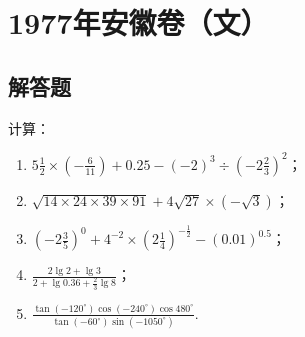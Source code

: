 \chapter{1977年安徽卷（文）}

\section{解答题}

\begin{problem}
计算：

\begin{enumerate}
    \item \(5\frac{1}{2}\times\left(-\frac{6}{11}\right)+0.25-(-2)^3\div\left(-2\frac{2}{3}\right)^2\)；
    \item \(\sqrt{14\times24\times39\times91}+4\sqrt{27}\times(-\sqrt{3})\)；
    \item \(\left(-2\frac{3}{5}\right)^0+4^{-2}\times\left(2\frac{1}{4}\right)^{-\frac{1}{2}}-(0.01)^{0.5}\)；
    \item \(\frac{2\lg2+\lg3}{2+\lg0.36+\frac{2}{3}\lg8}\)；
    \item \(\frac{\tan\left(-120^\circ\right)\cos\left(-240^\circ\right)\cos480^\circ}{\tan\left(-60^\circ\right)\sin\left(-1050^\circ\right)}\).
\end{enumerate}
\end{problem}

